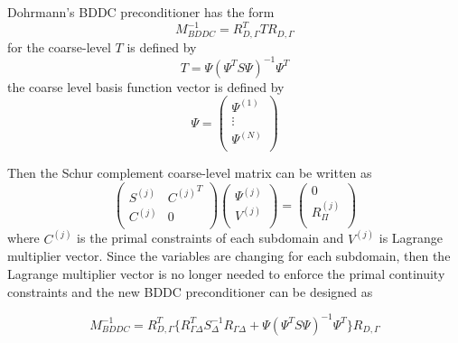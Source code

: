 Dohrmann's BDDC preconditioner \cite{dohrmann2003preconditioner, dohrmann2003study, mandel2005algebraic} has the form
\begin{equation}
M_{BDDC}^{-1} = R_{D, \Gamma}^{T} T R_{D, \Gamma}
\end{equation}
for the coarse-level $ T $ is defined by 
\begin{equation}
T = \Psi (\Psi^{T} S \Psi)^{-1} \Psi^{T}
\end{equation}
the coarse level basis function vector is defined by 
\begin{equation}
\Psi = \begin{pmatrix}
\Psi^{(1)} \\ \vdots \\ \Psi^{(N)}\\
\end{pmatrix}
\end{equation}

Then the Schur complement coarse-level matrix can be written as 
\begin{equation}
\begin{pmatrix}
S^{(j)} & {C^{(j)}}^{T} \\
C^{(j)} & 0 \\
\end{pmatrix} \begin{pmatrix}
\Psi^{(j)} \\ V^{(j)} \\
\end{pmatrix} = \begin{pmatrix}
0 \\ R_{\Pi}^{(j)}\\
\end{pmatrix}
\end{equation}
 where $ C^{(j)} $ is the primal constraints of each subdomain and $ V^{(j)} $ is Lagrange multiplier vector. Since the variables are changing for each subdomain, then the Lagrange multiplier vector is no longer needed to enforce the primal continuity constraints and the new BDDC preconditioner can be designed as
 
 \begin{equation}
 M_{BDDC}^{-1} = R_{D, \Gamma}^{T} \{ R_{\Gamma \Delta}^{T} S^{-1}_{\Delta} R_{\Gamma \Delta} + \Psi (\Psi^{T} S \Psi)^{-1} \Psi^{T} \} R_{D, \Gamma}
 \end{equation}
 
